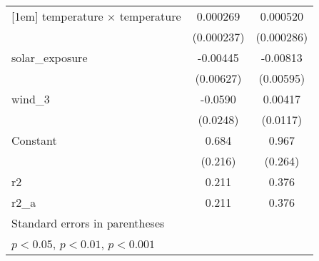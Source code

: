 {\begin{tabular}{l*{2}{c}}
[1em]
temperature $\times$ temperature&    0.000269         &    0.000520         \\
                    &  (0.000237)         &  (0.000286)         \\
[1em]
solar\_exposure      &    -0.00445         &    -0.00813         \\
                    &   (0.00627)         &   (0.00595)         \\
[1em]
wind\_3              &     -0.0590         &     0.00417         \\
                    &    (0.0248)         &    (0.0117)         \\
[1em]
Constant            &       0.684\sym{*}  &       0.967\sym{*}  \\
                    &     (0.216)         &     (0.264)         \\
\hline
r2                  &       0.211         &       0.376         \\
r2\_a                &       0.211         &       0.376         \\
\hline\hline
\multicolumn{3}{l}{\footnotesize Standard errors in parentheses}\\
\multicolumn{3}{l}{\footnotesize \sym{*} \(p<0.05\), \sym{**} \(p<0.01\), \sym{***} \(p<0.001\)}\\
\end{tabular}
}
